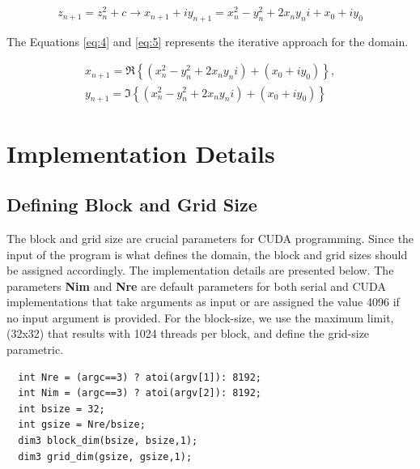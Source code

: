 \documentclass[12pt]{article}
\begin{document}
\begin{equation}
\label{eq:3}
    z_{n+1} = z_n^2 + c \rightarrow x_{n+1} + iy_{n+1} = x_n^2 - y_n^2 + 2x_ny_ni + x_0 + iy_0  
\end{equation}

\noindent
The Equations \ref{eq:4} and \ref{eq:5} represents the iterative approach for the domain.

\begin{align}
\label{eq:4}
x_{n+1} = \Re\left\{ (x_n^2 - y_n^2 + 2x_ny_ni) + (x_0 + iy_0) \right\}, \\
\label{eq:5}
y_{n+1} = \Im\left\{ (x_n^2 - y_n^2 + 2x_ny_ni) + (x_0 + iy_0) \right\}
\end{align}

\section{Implementation Details}
\label{sec:3}
\subsection{Defining Block and Grid Size}
The block and grid size are crucial parameters for CUDA programming. Since the input of the program is what defines the domain, the block and grid sizes should be assigned accordingly. The implementation details are presented below. The parameters \textbf{Nim} and \textbf{Nre} are default parameters for both serial and CUDA implementations that take arguments as input or are assigned the value 4096 if no input argument is provided. For the block-size, we use the maximum limit, (32x32) that results with 1024 threads per block, and define the grid-size parametric.
    \begin{verbatim}
  int Nre = (argc==3) ? atoi(argv[1]): 8192;
  int Nim = (argc==3) ? atoi(argv[2]): 8192;
  int bsize = 32;
  int gsize = Nre/bsize;
  dim3 block_dim(bsize, bsize,1);
  dim3 grid_dim(gsize, gsize,1);
    \end{verbatim}
\end{document}
